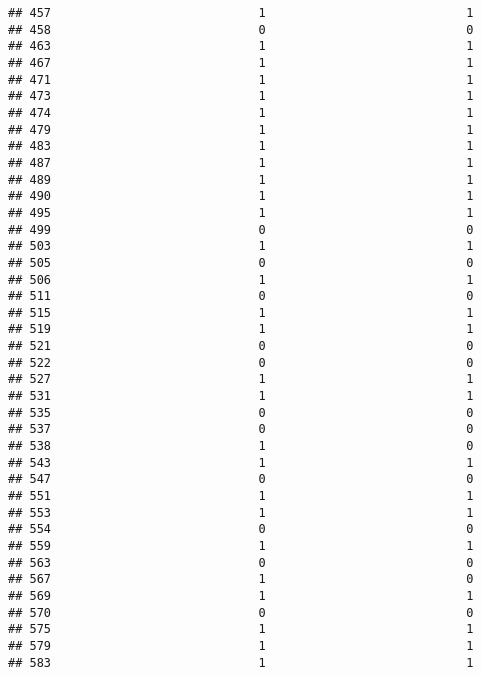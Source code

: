 \documentclass[
]{article}
\begin{document}
\begin{verbatim}
## 457                             1                            1
## 458                             0                            0
## 463                             1                            1
## 467                             1                            1
## 471                             1                            1
## 473                             1                            1
## 474                             1                            1
## 479                             1                            1
## 483                             1                            1
## 487                             1                            1
## 489                             1                            1
## 490                             1                            1
## 495                             1                            1
## 499                             0                            0
## 503                             1                            1
## 505                             0                            0
## 506                             1                            1
## 511                             0                            0
## 515                             1                            1
## 519                             1                            1
## 521                             0                            0
## 522                             0                            0
## 527                             1                            1
## 531                             1                            1
## 535                             0                            0
## 537                             0                            0
## 538                             1                            0
## 543                             1                            1
## 547                             0                            0
## 551                             1                            1
## 553                             1                            1
## 554                             0                            0
## 559                             1                            1
## 563                             0                            0
## 567                             1                            0
## 569                             1                            1
## 570                             0                            0
## 575                             1                            1
## 579                             1                            1
## 583                             1                            1

\end{verbatim}
\end{document}
